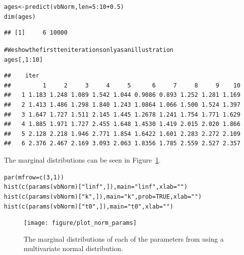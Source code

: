 \documentclass[a4paper,english,10pt]{article}\usepackage[]{graphicx}\usepackage[]{color}
\makeatletter
\newcommand{\hlnum}[1]{\textcolor[rgb]{0.2,0.2,0.2}{#1}}%
\newcommand{\hlstr}[1]{\textcolor[rgb]{0.2,0.2,0.2}{#1}}%
\newcommand{\hlcom}[1]{\textcolor[rgb]{0.2,0.267,0.4}{#1}}%
\newcommand{\hlopt}[1]{\textcolor[rgb]{0.2,0.2,0.2}{#1}}%
\newcommand{\hlstd}[1]{\textcolor[rgb]{0,0,0}{#1}}%
\newcommand{\hlkwb}[1]{\textcolor[rgb]{0.361,0.506,0.596}{#1}}%
\newcommand{\hlkwc}[1]{\textcolor[rgb]{0.361,0.506,0.596}{#1}}%
\newcommand{\hlkwd}[1]{\textcolor[rgb]{0.361,0.506,0.596}{#1}}%
\newenvironment{kframe}{%
 \def\at@end@of@kframe{}%
 \ifinner\ifhmode%
  \def\at@end@of@kframe{\end{minipage}}%
  \begin{minipage}{\columnwidth}%
 \fi\fi%
 \def\FrameCommand##1{\hskip\@totalleftmargin \hskip-\fboxsep
 \colorbox{shadecolor}{##1}\hskip-\fboxsep
     \hskip-\linewidth \hskip-\@totalleftmargin \hskip\columnwidth}%
 \MakeFramed {\advance\hsize-\width
   \@totalleftmargin\z@ \linewidth\hsize
   \@setminipage}}%
 {\par\unskip\endMakeFramed%
 \at@end@of@kframe}
\newenvironment{knitrout}{}{} %
\makeatother
\begin{document}
\begin{knitrout}
\color{fgcolor}\begin{kframe}
\begin{alltt}
\hlstd{ages} \hlkwb{<-} \hlkwd{predict}\hlstd{(vbNorm,} \hlkwc{len}\hlstd{=}\hlnum{5}\hlopt{:}\hlnum{10}\hlopt{+}\hlnum{0.5}\hlstd{)}
\hlkwd{dim}\hlstd{(ages)}
\end{alltt}
\begin{verbatim}
## [1]     6 10000
\end{verbatim}
\begin{alltt}
\hlcom{# We show the first ten iterations only as an illustration}
\hlstd{ages[,}\hlnum{1}\hlopt{:}\hlnum{10}\hlstd{]}
\end{alltt}
\begin{verbatim}
##    iter
##         1     2     3     4     5      6     7     8     9    10
##   1 1.183 1.248 1.089 1.542 1.044 0.9086 0.893 1.252 1.281 1.169
##   2 1.413 1.486 1.298 1.840 1.243 1.0864 1.066 1.500 1.524 1.397
##   3 1.647 1.727 1.511 2.145 1.445 1.2678 1.241 1.754 1.771 1.629
##   4 1.885 1.971 1.727 2.455 1.648 1.4530 1.419 2.015 2.020 1.866
##   5 2.128 2.218 1.946 2.771 1.854 1.6422 1.601 2.283 2.272 2.109
##   6 2.376 2.467 2.169 3.093 2.063 1.8356 1.785 2.559 2.527 2.357
\end{verbatim}
\end{kframe}
\end{knitrout}

The marginal distributions can be seen in Figure~\ref{fig:plot_norm_params}.

\begin{knitrout}
\color{fgcolor}\begin{kframe}
\begin{alltt}
\hlkwd{par}\hlstd{(}\hlkwc{mfrow}\hlstd{=}\hlkwd{c}\hlstd{(}\hlnum{3}\hlstd{,}\hlnum{1}\hlstd{))}
\hlkwd{hist}\hlstd{(}\hlkwd{c}\hlstd{(}\hlkwd{params}\hlstd{(vbNorm)[}\hlstr{"linf"}\hlstd{,]),} \hlkwc{main}\hlstd{=}\hlstr{"linf"}\hlstd{,} \hlkwc{xlab}\hlstd{=}\hlstr{""}\hlstd{)}
\hlkwd{hist}\hlstd{(}\hlkwd{c}\hlstd{(}\hlkwd{params}\hlstd{(vbNorm)[}\hlstr{"k"}\hlstd{,]),} \hlkwc{main}\hlstd{=}\hlstr{"k"}\hlstd{,} \hlkwc{prob}\hlstd{=}\hlnum{TRUE}\hlstd{,} \hlkwc{xlab}\hlstd{=}\hlstr{""}\hlstd{)}
\hlkwd{hist}\hlstd{(}\hlkwd{c}\hlstd{(}\hlkwd{params}\hlstd{(vbNorm)[}\hlstr{"t0"}\hlstd{,]),} \hlkwc{main}\hlstd{=}\hlstr{"t0"}\hlstd{,} \hlkwc{xlab}\hlstd{=}\hlstr{""}\hlstd{)}
\end{alltt}
\end{kframe}\begin{figure}[H]


{\centering \texttt{[image: figure/plot\_norm\_params]} 

}

\caption[The marginal distributions of each of the parameters from using a multivariate normal distribution]{The marginal distributions of each of the parameters from using a multivariate normal distribution.\label{fig:plot_norm_params}}
\end{figure}


\end{knitrout}
\end{document}

